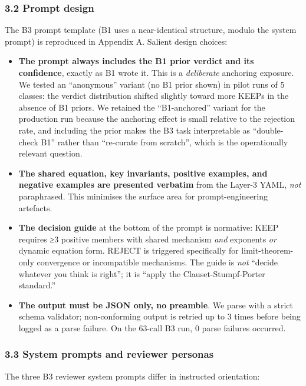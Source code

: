 \documentclass[
  letterpaper,
  11pt]{article}
\providecommand{\tightlist}{%
  \setlength{\itemsep}{0pt}\setlength{\parskip}{0pt}}
\begin{document}
\subsubsection{3.2 Prompt design}\label{prompt-design}

The B3 prompt template (B1 uses a near-identical structure, modulo the
system prompt) is reproduced in Appendix A. Salient design choices:

\begin{itemize}
\tightlist
\item
  \textbf{The prompt always includes the B1 prior verdict and its
  confidence}, exactly as B1 wrote it. This is a \emph{deliberate}
  anchoring exposure. We tested an ``anonymous'' variant (no B1 prior
  shown) in pilot runs of 5 classes: the verdict distribution shifted
  slightly toward more KEEPs in the absence of B1 priors. We retained
  the ``B1-anchored'' variant for the production run because the
  anchoring effect is small relative to the rejection rate, and
  including the prior makes the B3 task interpretable as ``double-check
  B1'' rather than ``re-curate from scratch'', which is the
  operationally relevant question.
\item
  \textbf{The shared equation, key invariants, positive examples, and
  negative examples are presented verbatim} from the Layer-3 YAML,
  \emph{not} paraphrased. This minimises the surface area for
  prompt-engineering artefacts.
\item
  \textbf{The decision guide} at the bottom of the prompt is normative:
  KEEP requires ≥3 positive members with shared mechanism \emph{and}
  exponents \emph{or} dynamic equation form. REJECT is triggered
  specifically for limit-theorem-only convergence or incompatible
  mechanisms. The guide is \emph{not} ``decide whatever you think is
  right''; it is ``apply the Clauset-Stumpf-Porter standard.''
\item
  \textbf{The output must be JSON only, no preamble}. We parse with a
  strict schema validator; non-conforming output is retried up to 3
  times before being logged as a parse failure. On the 63-call B3 run, 0
  parse failures occurred.
\end{itemize}

\subsubsection{3.3 System prompts and reviewer
personas}\label{system-prompts-and-reviewer-personas}

The three B3 reviewer system prompts differ in instructed orientation:
\end{document}
